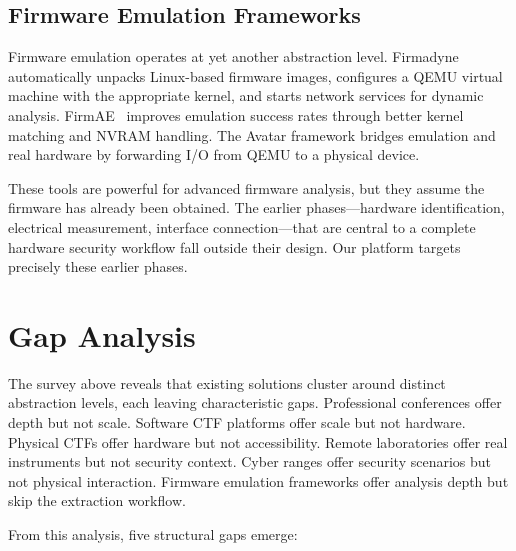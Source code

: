 \subsection{Firmware Emulation Frameworks}\label{subsec:firmware-emu}

Firmware emulation operates at yet another abstraction level. Firmadyne~\cite{firmadyne2016} automatically unpacks Linux-based firmware images, configures a QEMU virtual machine with the appropriate kernel, and starts network services for dynamic analysis. FirmAE~\cite{firmae2020} improves emulation success rates through better kernel matching and NVRAM handling. The Avatar framework bridges emulation and real hardware by forwarding I/O from QEMU to a physical device.

These tools are powerful for advanced firmware analysis, but they assume the firmware has already been obtained. The earlier phases---hardware identification, electrical measurement, interface connection---that are central to a complete hardware security workflow fall outside their design. Our platform targets precisely these earlier phases.

\section{Gap Analysis}\label{sec:gaps}

The survey above reveals that existing solutions cluster around distinct abstraction levels, each leaving characteristic gaps. Professional conferences offer depth but not scale. Software CTF platforms offer scale but not hardware. Physical CTFs offer hardware but not accessibility. Remote laboratories offer real instruments but not security context. Cyber ranges offer security scenarios but not physical interaction. Firmware emulation frameworks offer analysis depth but skip the extraction workflow.

From this analysis, five structural gaps emerge:

